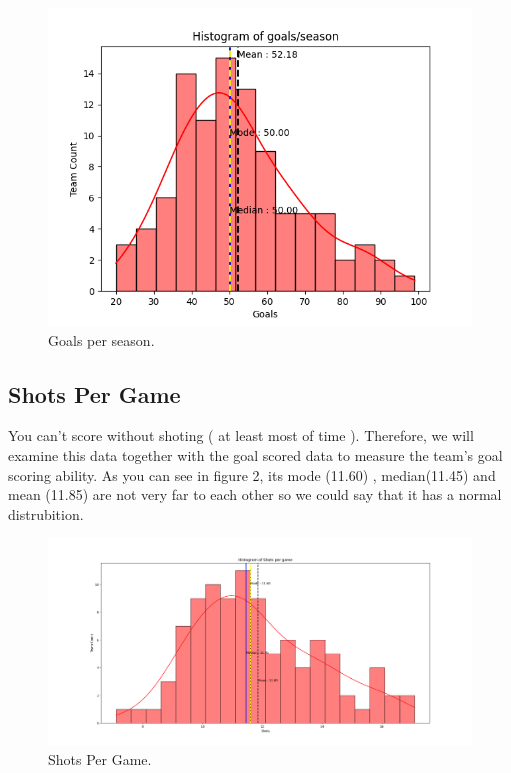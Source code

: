 \documentclass[conference]{IEEEtran}
\begin{document}
\begin{figure}[h]
  \includegraphics[width=\linewidth]{GoalFigure.png}
  \caption{Goals per season.}
  \label{fig:boat1}
\end{figure}



\subsection{Shots Per Game}
You can't score without shoting ( at least most of time ). Therefore, we will examine this data together with the goal scored data to measure the team's goal scoring ability. As you can see in figure 2, its mode (11.60) , median(11.45)  and mean (11.85)  are not very far to each other so we could say that it has a normal distrubition.

\begin{figure}[h]
  \includegraphics[width=\linewidth]{ShootsPg.png}
  \caption{Shots Per Game.}
  \label{fig:shotspg}
\end{figure}
\end{document}
